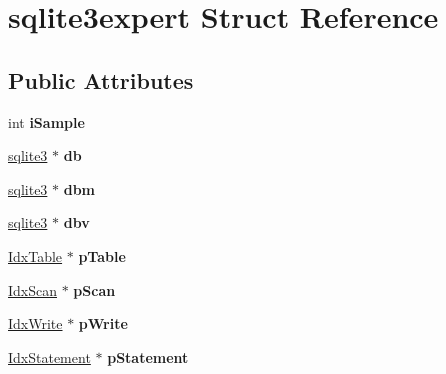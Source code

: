 \hypertarget{structsqlite3expert}{}\section{sqlite3expert Struct Reference}
\label{structsqlite3expert}
\subsection*{Public Attributes}
\begin{DoxyCompactItemize}
\item 
\mbox{\label{structsqlite3expert_abd4f85f332fbfe972ac69e4ad67fbd03}} 
int {\bfseries i\+Sample}
\item 
\mbox{\label{structsqlite3expert_ad082f626b55a38550ea3bd2264cb0c1a}} 
\mbox{\hyperlink{structsqlite3}{sqlite3}} $\ast$ {\bfseries db}
\item 
\mbox{\label{structsqlite3expert_a20ffd09e039d390e9b3a5b82d7852014}} 
\mbox{\hyperlink{structsqlite3}{sqlite3}} $\ast$ {\bfseries dbm}
\item 
\mbox{\label{structsqlite3expert_ac44c48b64c21e651f2992a3804f4cdc3}} 
\mbox{\hyperlink{structsqlite3}{sqlite3}} $\ast$ {\bfseries dbv}
\item 
\mbox{\label{structsqlite3expert_ab801dd7d4c0160a49da28adc70aebb5f}} 
\mbox{\hyperlink{struct_idx_table}{Idx\+Table}} $\ast$ {\bfseries p\+Table}
\item 
\mbox{\label{structsqlite3expert_af3cd9f8d25c116e1bbb79ad10213dc30}} 
\mbox{\hyperlink{struct_idx_scan}{Idx\+Scan}} $\ast$ {\bfseries p\+Scan}
\item 
\mbox{\label{structsqlite3expert_a9a00a63fff16605e649e35f9c3a407fb}} 
\mbox{\hyperlink{struct_idx_write}{Idx\+Write}} $\ast$ {\bfseries p\+Write}
\item 
\mbox{\label{structsqlite3expert_a36c2656ad6e92969c1508d4d1701117e}} 
\mbox{\hyperlink{struct_idx_statement}{Idx\+Statement}} $\ast$ {\bfseries p\+Statement}
\item 

\end{DoxyCompactItemize}
